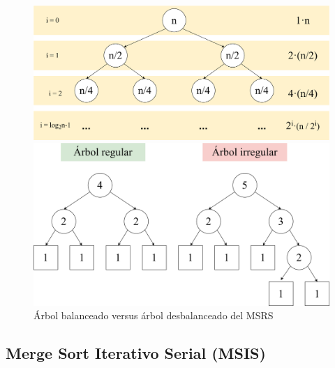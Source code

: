\documentclass[titlepage]{article}
\begin{document}
\begin{figure}[h]
\centering 
\captionsetup{justification=centering, margin=10pt}
\begin{minipage}{0.5\textwidth} 
    \centering 
    \includegraphics[width=0.95\linewidth]{Diagrames/arbolBinarioLenght.png} 
    \caption{Tamaño de la entrada a lo largo de las llamadas a \lstinline{sort()}} 
    \label{fig:entradaMSRS}
\end{minipage}\hfill 
\begin{minipage}{0.5\textwidth} 
    \centering 
    \includegraphics[width=0.95\linewidth]{Diagrames/arbolBinario_MSRS.png} 
    \caption{Árbol balanceado versus árbol desbalanceado del MSRS} 
    \label{fig:simetriaMSRS}
\end{minipage} 
\end{figure}

\subsection{Merge Sort Iterativo Serial (MSIS)} %
\end{document}
